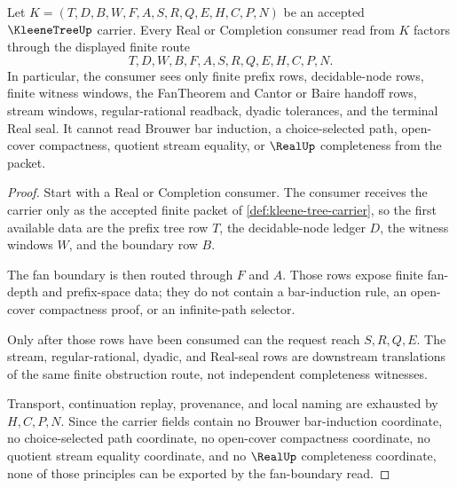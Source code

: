 \begin{theorem}
\label{thm:kleene-tree-fan-boundary}
Let $K=(T,D,B,W,F,A,S,R,Q,E,H,C,P,N)$ be an accepted $\KleeneTreeUp$ carrier. Every Real or Completion consumer read from $K$ factors through the displayed finite route
$$
T,D,W,B,F,A,S,R,Q,E,H,C,P,N .
$$
In particular, the consumer sees only finite prefix rows, decidable-node rows, finite witness windows, the FanTheorem and Cantor or Baire handoff rows, stream windows, regular-rational readback, dyadic tolerances, and the terminal Real seal. It cannot read Brouwer bar induction, a choice-selected path, open-cover compactness, quotient stream equality, or $\RealUp$ completeness from the packet.
\end{theorem}
\begin{proof}
Start with a Real or Completion consumer. The consumer receives the carrier only as the accepted finite packet of \autoref{def:kleene-tree-carrier}, so the first available data are the prefix tree row $T$, the decidable-node ledger $D$, the witness windows $W$, and the boundary row $B$.

The fan boundary is then routed through $F$ and $A$. Those rows expose finite fan-depth and prefix-space data; they do not contain a bar-induction rule, an open-cover compactness proof, or an infinite-path selector.

Only after those rows have been consumed can the request reach $S,R,Q,E$. The stream, regular-rational, dyadic, and Real-seal rows are downstream translations of the same finite obstruction route, not independent completeness witnesses.

Transport, continuation replay, provenance, and local naming are exhausted by $H,C,P,N$. Since the carrier fields contain no Brouwer bar-induction coordinate, no choice-selected path coordinate, no open-cover compactness coordinate, no quotient stream equality coordinate, and no $\RealUp$ completeness coordinate, none of those principles can be exported by the fan-boundary read.
\end{proof}

